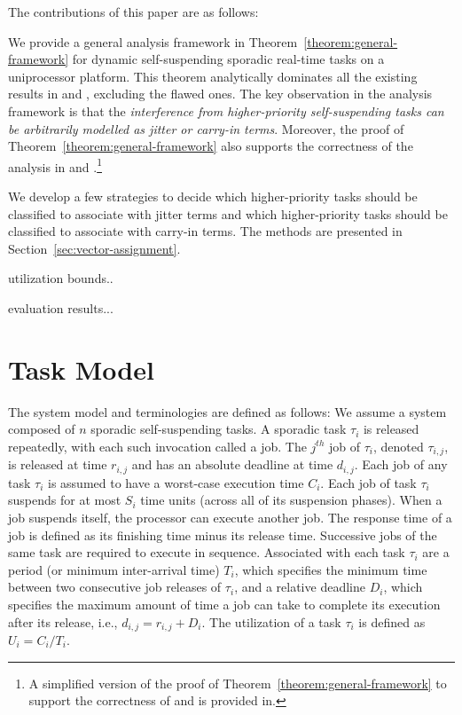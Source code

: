\documentclass[10pt,conference,preprint]{IEEEtran}
\begin{document}
The contributions of this paper are as follows:
\begin{compactitem}
\item We provide a general analysis framework in
  Theorem~\ref{theorem:general-framework} for dynamic self-suspending
  sporadic real-time tasks on a uniprocessor platform. This theorem analytically
  dominates all the existing results in
  \cite{BletsasReport2015,huangpass:dac2015} and \cite[Pages
  164-165]{Liu:2000:RS:518501}, excluding the flawed ones. The key observation in the analysis
  framework is that the \emph{interference from higher-priority
    self-suspending tasks can be arbitrarily modelled as jitter or
    carry-in terms}. Moreover, the proof of
  Theorem~\ref{theorem:general-framework} also supports the
  correctness of the analysis in \cite[Pages
  164-165]{Liu:2000:RS:518501} and
  \cite[Page 267]{DBLP:conf/rtss/RajkumarSL88}.\footnote{A simplified
    version of the proof of Theorem~\ref{theorem:general-framework} to
    support the correctness of \cite[Pages
  164-165]{Liu:2000:RS:518501} and \cite[Page 267]{DBLP:conf/rtss/RajkumarSL88} is
  provided in\cite{ChenHuangNelissen}. }
\item We develop a few strategies to decide which higher-priority
  tasks should be classified to associate with jitter terms and which
  higher-priority tasks should be classified to associate with carry-in
  terms. The methods are presented in
  Section~\ref{sec:vector-assignment}.
\item utilization bounds..
\item evaluation results...
\end{compactitem}




\section{Task Model}




The system model and terminologies are defined as follows: We assume a system composed of $n$ sporadic self-suspending tasks. A sporadic task $\tau_i$ is released repeatedly, with each such invocation called a
job. The $j^{th}$ job of $\tau_i$, denoted $\tau_{i,j}$, is released
at time $r_{i,j}$ and has an absolute deadline at time $d_{i,j}$. Each
job of any task $\tau_i$ is assumed to have a worst-case execution time $C_i$. Each job of task $\tau_i$ 
suspends for at most $S_i$ time units (across all of its suspension phases). When a job suspends itself, 
the processor can execute another job. 
The response time
of a job is defined as its finishing time minus its release
time. Successive jobs of the same task are required to execute in
sequence. Associated with each task $\tau_i$ are a period (or minimum inter-arrival time) $T_i$, which
specifies the minimum time between two consecutive job releases of
$\tau_i$, and a relative deadline $D_i$, which specifies the maximum
amount of time a job can take to complete its execution after its
release, i.e., $d_{i,j}=r_{i,j}+D_i$. 
 The utilization of a task $\tau_i$ is defined as $U_i=C_i/T_i$.
\end{document}
